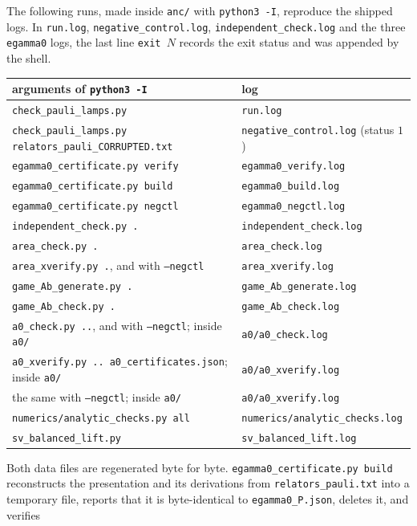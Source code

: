 The following runs, made inside \texttt{anc/} with \texttt{python3 -I}, reproduce the shipped logs. In
\texttt{run.log}, \texttt{negative\_control.log}, \texttt{independent\_check.log} and the three \texttt{egamma0} logs, the last line
\texttt{exit $N$} records the exit status and was appended by the shell.
\begin{center}\small
\begin{tabular}{@{}ll@{}}
\toprule
arguments of \texttt{python3 -I} & log \\
\midrule
\texttt{check\_pauli\_lamps.py} & \texttt{run.log} \\
\texttt{check\_pauli\_lamps.py relators\_pauli\_CORRUPTED.txt} & \texttt{negative\_control.log} (status $1$) \\
\texttt{egamma0\_certificate.py verify} & \texttt{egamma0\_verify.log} \\
\texttt{egamma0\_certificate.py build} & \texttt{egamma0\_build.log} \\
\texttt{egamma0\_certificate.py negctl} & \texttt{egamma0\_negctl.log} \\
\texttt{independent\_check.py .} & \texttt{independent\_check.log} \\
\texttt{area\_check.py .} & \texttt{area\_check.log} \\
\texttt{area\_xverify.py .}, and with \texttt{--negctl} & \texttt{area\_xverify.log} \\
\texttt{game\_Ab\_generate.py .} & \texttt{game\_Ab\_generate.log} \\
\texttt{game\_Ab\_check.py .} & \texttt{game\_Ab\_check.log} \\
\texttt{a0\_check.py ..}, and with \texttt{--negctl}; inside \texttt{a0/} & \texttt{a0/a0\_check.log} \\
\texttt{a0\_xverify.py .. a0\_certificates.json}; inside \texttt{a0/} & \texttt{a0/a0\_xverify.log} \\
the same with \texttt{--negctl}; inside \texttt{a0/} & \texttt{a0/a0\_xverify.log} \\
\texttt{numerics/analytic\_checks.py all} & \texttt{numerics/analytic\_checks.log} \\
\texttt{sv\_balanced\_lift.py} & \texttt{sv\_balanced\_lift.log} \\
\bottomrule
\end{tabular}
\end{center}
Both data files are regenerated byte for byte. \texttt{egamma0\_certificate.py build} reconstructs the presentation and its derivations from
\texttt{relators\_pauli.txt} into a temporary file, reports that it is byte-identical to \texttt{egamma0\_P.json}, deletes it, and verifies
